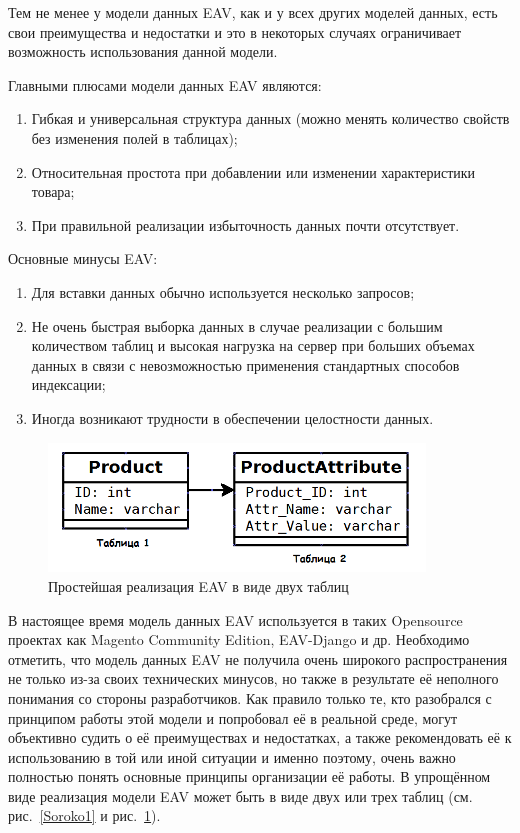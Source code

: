 \documentclass[10pt, a5paper]{article}
\begin{document}
Тем не менее у модели данных EAV, как и у всех других моделей данных, есть свои преимущества и недостатки и это в некоторых случаях ограничивает возможность использования данной модели.

Главными плюсами модели данных EAV являются:

\begin{enumerate}
\item Гибкая и универсальная структура данных (можно менять количество свойств без изменения полей в таблицах);
\item Относительная простота при добавлении или изменении характеристики товара;
\item При правильной реализации избыточность данных почти отсутствует.
\end{enumerate}

Основные минусы EAV:
\begin{enumerate}
\item Для вставки данных обычно используется несколько запросов;
\item Не очень быстрая выборка данных в случае реализации с большим количеством таблиц и высокая нагрузка на сервер при больших объемах данных в связи с невозможностью применения стандартных способов индексации;
\item Иногда возникают трудности в обеспечении целостности данных.
\end{enumerate}

\begin{figure}[h!]
  \centering
  \includegraphics[width=10cm]{w_10_2016_Soroko2.png}
  \caption {Простейшая реализация EAV в виде двух таблиц}\label{Soroko2}
\end{figure} 

В настоящее время модель данных EAV используется в таких Opensource проектах как  Magento Community Edition, EAV-Django и др.  Необходимо отметить, что модель данных EAV не получила очень широкого распространения не только из-за своих технических минусов, но также в результате её неполного понимания со стороны разработчиков. Как правило только те, кто разобрался с принципом работы этой модели и попробовал её в реальной среде, могут объективно судить о её преимуществах и недостатках,  а также рекомендовать её к использованию в той или иной ситуации и именно поэтому, очень важно полностью понять основные принципы  организации её работы. В упрощённом виде реализация модели EAV может быть в виде двух или трех таблиц (см. рис.~\ref{Soroko1} и рис.~\ref{Soroko2}).
\end{document}
